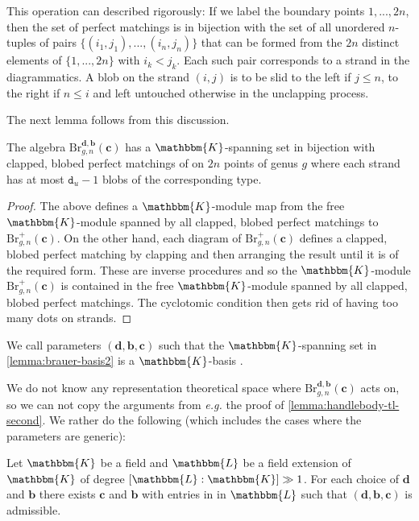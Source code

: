 \documentclass[a4paper,11pt]{amsart}
\let\emph\relax
\newcommand{\eg}{\textsl{e.g.}}
\renewcommand{\dots}{\text{...}}
\newcommand{\setstuff}[1]{\mathrm{#1}}
\newcommand{\KK}{\mathbbm{K}}
\newcommand{\KKL}{\mathbbm{L}}
\newcommand{\bsym}[1]{\boldsymbol{#1}}
\newcommand{\varsym}[1]{\mathtt{#1}}
\newcommand{\cpar}{\bsym{c}}
\newcommand{\bpar}{\bsym{b}}
\newcommand{\dpar}{\bsym{d}}
\newcommand{\dvar}{\varsym{d}}
\numberwithin{equation}{section}
\let\fullref\autoref
\begin{document}
This operation can described rigorously: 
If we label the boundary 
points $1,\dots,2n$, then  
the set of perfect matchings is in 
bijection with the set of all 
unordered $n$-tuples of pairs 
$\{(i_{1},j_{1}),\dots,(i_{n},j_{n})\}$ that can be formed from the $2n$ 
distinct elements of $\{1,\dots,2n\}$ with $i_{k}<j_{k}$. Each such pair corresponds to a strand in the diagrammatics. 
A blob on the strand $(i,j)$ is to be slid to the 
left if $j\leq n$, to the right if $n\leq i$ 
and left untouched otherwise in the unclapping process.

The next lemma follows from this discussion.

\begin{lemma}\label{lemma:brauer-basis2}
The algebra 
$\setstuff{Br}_{g,n}^{\dpar,\bpar}(\cpar)$ 
has a $\KK$-spanning set in bijection with clapped, blobed 
perfect matchings of 
on $2n$ points of genus  
$g$ where each strand has at 
most $\dvar_{u}-1$ blobs of the corresponding type.
\end{lemma}

\begin{proof}
The above defines a $\KK$-module map from 
the free $\KK$-module spanned by all 
clapped, blobed perfect matchings to 
$\setstuff{Br}^{+}_{g,n}(\cpar)$.	
On the other hand, each diagram of 
$\setstuff{Br}^{+}_{g,n}(\cpar)$ defines a 
clapped, blobed perfect 
matching by clapping and then arranging the result until it is of the required form.
These are inverse 
procedures and so the $\KK$-module 
$\setstuff{Br}^{+}_{g,n}(\cpar)$ 
is contained in the free 
$\KK$-module spanned by all 
clapped, blobed perfect matchings.
The cyclotomic condition then gets rid of 
having too many dots on strands.
\end{proof}

\begin{definition}\label{def:bmw-admissible}
We call parameters $(\dpar,\bpar,\cpar)$ such that the $\KK$-spanning set 
in \fullref{lemma:brauer-basis2} is a $\KK$-basis \emph{admissible}.
\end{definition}

We do not know any representation theoretical space 
where $\setstuff{Br}_{g,n}^{\dpar,\bpar}(\cpar)$ acts on, 
so we can not copy the arguments from {\eg} the proof of \fullref{lemma:handlebody-tl-second}. We rather do the following 
(which includes the cases where the parameters are generic):

\begin{lemma}\label{lemma:handlebody-blobbmw-second}
Let $\KK$ be a field and
$\KKL$ be a field extension of $\KK$ 
of degree $[\KKL:\KK]\gg 1$.
For each choice of $\dpar$ and $\bpar$ 
there exists $\cpar$ and $\bpar$ with entries in
in $\KKL$ such that $(\dpar,\bpar,\cpar)$ is admissible.
\end{lemma}
\end{document}
